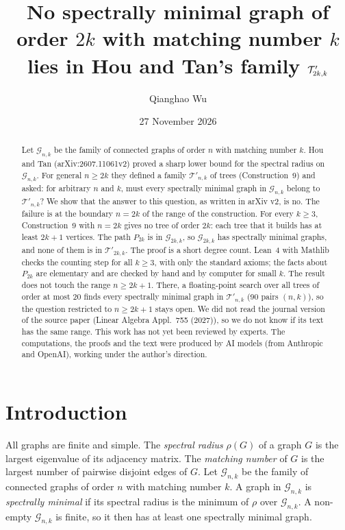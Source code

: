 \documentclass[11pt]{article}
\title{No spectrally minimal graph of order $2k$ with matching number $k$\\
lies in Hou and Tan's family $\Tp_{2k,k}$}
\author{Qianghao Wu}
\date{27 November 2026}
\theoremstyle{definition}
\newcommand{\G}{\mathcal{G}}
\newcommand{\Tp}{\mathcal{T}'}
\begin{document}
\maketitle

\begin{abstract}
Let $\G_{n,k}$ be the family of connected graphs of order $n$ with matching number $k$.
Hou and Tan (arXiv:2607.11061v2) proved a sharp lower bound for the spectral radius on
$\G_{n,k}$. For general $n \ge 2k$ they defined a family $\Tp_{n,k}$ of trees
(Construction~9) and asked: for arbitrary $n$ and $k$, must every spectrally minimal graph
in $\G_{n,k}$ belong to $\Tp_{n,k}$? We show that the answer to this question, as written
in arXiv v2, is no. The failure is at the boundary $n = 2k$ of the range of the
construction. For every $k \ge 3$, Construction~9 with $n = 2k$ gives no tree of order
$2k$: each tree that it builds has at least $2k+1$ vertices. The path $P_{2k}$ is in
$\G_{2k,k}$, so $\G_{2k,k}$ has spectrally minimal graphs, and none of them is in
$\Tp_{2k,k}$. The proof is a short degree count. Lean~4 with Mathlib checks the counting
step for all $k \ge 3$, with only the standard axioms; the facts about $P_{2k}$ are
elementary and are checked by hand and by computer for small $k$. The result does not
touch the range $n \ge 2k+1$. There, a floating-point search over all trees of order at
most 20 finds every spectrally minimal graph in $\Tp_{n,k}$ (90 pairs $(n,k)$), so the
question restricted to $n \ge 2k+1$ stays open. We did not read the journal version of
the source paper (Linear Algebra Appl.\ 755 (2027)), so we do not know if its text has
the same range. This work has not yet been reviewed by experts. The computations, the
proofs and the text were produced by AI models (from Anthropic and OpenAI), working under
the author's direction.
\end{abstract}

\section{Introduction}

All graphs are finite and simple. The \emph{spectral radius} $\rho(G)$ of a graph $G$ is
the largest eigenvalue of its adjacency matrix. The \emph{matching number} of $G$ is the
largest number of pairwise disjoint edges of $G$. Let $\G_{n,k}$ be the family of connected
graphs of order $n$ with matching number $k$. A graph in $\G_{n,k}$ is \emph{spectrally
minimal} if its spectral radius is the minimum of $\rho$ over $\G_{n,k}$. A non-empty
$\G_{n,k}$ is finite, so it then has at least one spectrally minimal graph.
\end{document}
